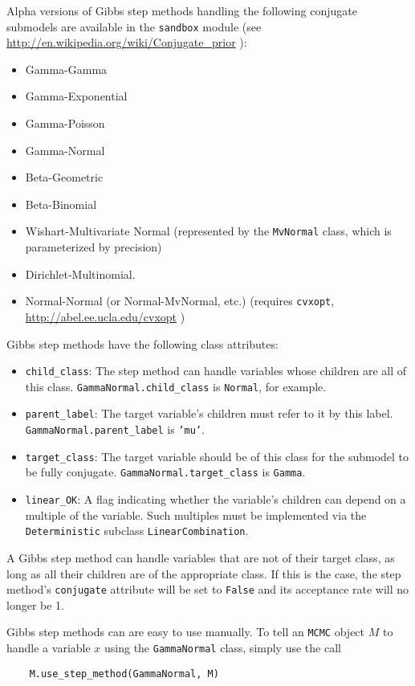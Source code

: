 Alpha versions of Gibbs step methods handling the following conjugate submodels are available in the \texttt{sandbox} module (see \href{http://en.wikipedia.org/wiki/Conjugate_prior}{http://en.wikipedia.org/wiki/Conjugate_prior} ):
\begin{itemize}
    \item Gamma-Gamma
    \item Gamma-Exponential
    \item Gamma-Poisson
    \item Gamma-Normal
    \item Beta-Geometric
    \item Beta-Binomial
    \item Wishart-Multivariate Normal (represented by the \texttt{MvNormal} class, which is parameterized by precision)
    \item Dirichlet-Multinomial.
    \item Normal-Normal (or Normal-MvNormal, etc.) (requires \texttt{cvxopt}, \href{http://abel.ee.ucla.edu/cvxopt}{http://abel.ee.ucla.edu/cvxopt} )
\end{itemize}

Gibbs step methods have the following class attributes:
\begin{itemize}
    \item \texttt{child_class}: The step method can handle variables whose children are all of this class. \texttt{GammaNormal.child_class} is \texttt{Normal}, for example.
    \item \texttt{parent_label}: The target variable's children must refer to it by this label. \texttt{GammaNormal.parent_label} is \texttt{'mu'}.
    \item \texttt{target_class}: The target variable should be of this class for the submodel to be fully conjugate. \texttt{GammaNormal.target_class} is \texttt{Gamma}.
    \item \texttt{linear_OK}: A flag indicating whether the variable's children can depend on a multiple of the variable. Such multiples must be implemented via the \texttt{Deterministic} subclass \texttt{LinearCombination}.
\end{itemize}

A Gibbs step method can handle variables that are not of their target class, as long as all their children are of the appropriate class. If this is the case, the step method's \texttt{conjugate} attribute will be set to \texttt{False} and its acceptance rate will no longer be 1.

Gibbs step methods can are easy to use manually. To tell an \texttt{MCMC} object $M$ to handle a variable $x$ using the \texttt{GammaNormal} class, simply use the call
\begin{verbatim}
    M.use_step_method(GammaNormal, M)
\end{verbatim}

